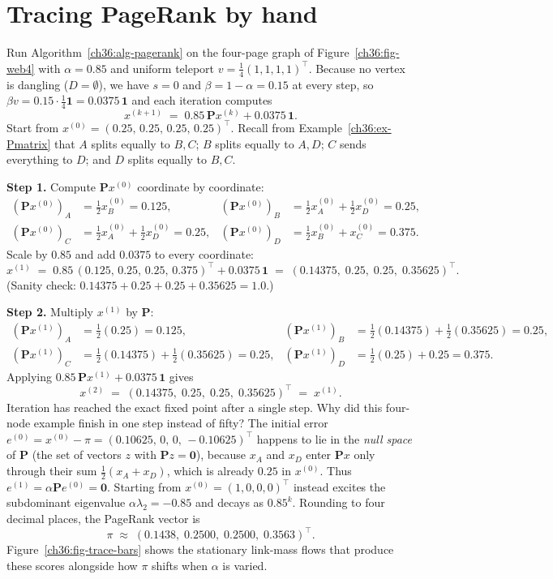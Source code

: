 \section{Tracing PageRank by hand}
\label{ch36:trace}

Run Algorithm~\ref{ch36:alg-pagerank} on the four-page graph of Figure~\ref{ch36:fig-web4} with $\alpha = 0.85$ and uniform teleport $v = \tfrac14(1,1,1,1)^\top$. Because no vertex is dangling ($D = \emptyset$), we have $s = 0$ and $\beta = 1-\alpha = 0.15$ at every step, so $\beta v = 0.15 \cdot \tfrac14\mathbf{1} = 0.0375\,\mathbf{1}$ and each iteration computes
\[
  x^{(k+1)} \;=\; 0.85\,\mathbf{P}x^{(k)} + 0.0375\,\mathbf{1}.
\]
Start from $x^{(0)} = (0.25,\,0.25,\,0.25,\,0.25)^\top$. Recall from Example~\ref{ch36:ex-Pmatrix} that $A$ splits equally to $B,C$; $B$ splits equally to $A,D$; $C$ sends everything to $D$; and $D$ splits equally to $B,C$.

\textbf{Step 1.} Compute $\mathbf{P}x^{(0)}$ coordinate by coordinate:
\begin{align*}
(\mathbf{P}x^{(0)})_A &= \tfrac12 x^{(0)}_B = 0.125, &
(\mathbf{P}x^{(0)})_B &= \tfrac12 x^{(0)}_A + \tfrac12 x^{(0)}_D = 0.25,\\
(\mathbf{P}x^{(0)})_C &= \tfrac12 x^{(0)}_A + \tfrac12 x^{(0)}_D = 0.25, &
(\mathbf{P}x^{(0)})_D &= \tfrac12 x^{(0)}_B + x^{(0)}_C = 0.375.
\end{align*}
Scale by $0.85$ and add $0.0375$ to every coordinate:
\[
  x^{(1)} \;=\; 0.85\,(0.125,\, 0.25,\, 0.25,\, 0.375)^\top + 0.0375\,\mathbf{1}
  \;=\; (0.14375,\; 0.25,\; 0.25,\; 0.35625)^\top.
\]
(Sanity check: $0.14375 + 0.25 + 0.25 + 0.35625 = 1.0$.)

\textbf{Step 2.} Multiply $x^{(1)}$ by $\mathbf{P}$:
\begin{align*}
(\mathbf{P}x^{(1)})_A &= \tfrac12(0.25) = 0.125, &
(\mathbf{P}x^{(1)})_B &= \tfrac12(0.14375) + \tfrac12(0.35625) = 0.25,\\
(\mathbf{P}x^{(1)})_C &= \tfrac12(0.14375) + \tfrac12(0.35625) = 0.25, &
(\mathbf{P}x^{(1)})_D &= \tfrac12(0.25) + 0.25 = 0.375.
\end{align*}
Applying $0.85\,\mathbf{P}x^{(1)} + 0.0375\,\mathbf{1}$ gives
\[
  x^{(2)} \;=\; (0.14375,\; 0.25,\; 0.25,\; 0.35625)^\top \;=\; x^{(1)}.
\]
Iteration has reached the exact fixed point after a single step. Why did this four-node example finish in one step instead of fifty? The initial error $e^{(0)} = x^{(0)} - \pi = (0.10625,\, 0,\, 0,\, -0.10625)^\top$ happens to lie in the \emph{null space} of $\mathbf{P}$ (the set of vectors $z$ with $\mathbf{P}z = \mathbf{0}$), because $x_A$ and $x_D$ enter $\mathbf{P}x$ only through their sum $\tfrac12(x_A + x_D)$, which is already $0.25$ in $x^{(0)}$. Thus $e^{(1)} = \alpha\mathbf{P}e^{(0)} = \mathbf{0}$. Starting from $x^{(0)} = (1,0,0,0)^\top$ instead excites the subdominant eigenvalue $\alpha\lambda_2 = -0.85$ and decays as $0.85^k$. Rounding to four decimal places, the PageRank vector is
\[
  \pi \;\approx\; (0.1438,\; 0.2500,\; 0.2500,\; 0.3563)^\top.
\]
Figure~\ref{ch36:fig-trace-bars} shows the stationary link-mass flows that produce these scores alongside how $\pi$ shifts when $\alpha$ is varied.

